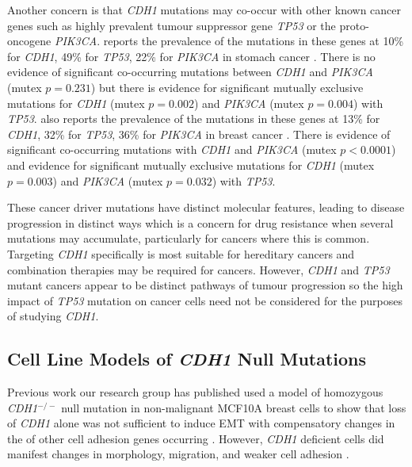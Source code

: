 Another concern is that \textit{CDH1} \glspl{mutation} may co-occur with other known cancer  genes such as highly prevalent \gls{tumour suppressor} gene \textit{\textit{TP53}} or the proto-oncogene \textit{\textit{PIK3CA}}. \citet{cBioPortal} reports the prevalence of the \glspl{mutation} in these genes at 10\% for \textit{CDH1}, 49\% for \textit{\textit{TP53}}, 22\% for \textit{\textit{PIK3CA}} in stomach cancer \citep[393 samples]{TCGA2017prov}. There is no evidence of significant co-occurring \glspl{mutation} between \textit{CDH1} and \textit{\textit{PIK3CA}} (mutex $p=0.231$) but there is evidence for significant mutually exclusive \glspl{mutation} for \textit{CDH1} (mutex $p=0.002$) and \textit{\textit{PIK3CA}} (mutex $p=0.004$) with \textit{\textit{TP53}}. \citet{cBioPortal} also reports the prevalence of the \glspl{mutation} in these genes at 13\% for \textit{CDH1}, 32\% for \textit{\textit{TP53}}, 36\% for \textit{\textit{PIK3CA}} in breast cancer \citep[963 samples]{TCGA2017prov}. There is evidence of significant co-occurring \glspl{mutation} with \textit{CDH1} and \textit{\textit{PIK3CA}} (mutex $p<0.0001$) and evidence for significant mutually exclusive \glspl{mutation} for \textit{CDH1} (mutex $p=0.003$) and \textit{\textit{PIK3CA}} (mutex $p=0.032$) with \textit{\textit{TP53}}.

These cancer \glspl{driver mutation} have distinct molecular features, leading to disease progression in distinct ways which is a concern for drug resistance when several \glspl{mutation} may accumulate, particularly for  cancers where this is common. Targeting \textit{CDH1} specifically is most suitable for \gls{hereditary} cancers and combination therapies may be required for  cancers. However, \textit{CDH1} and \textit{\textit{TP53}} \gls{mutant} cancers appear to be distinct pathways of tumour progression so the high impact of \textit{\textit{TP53}} \gls{mutation} on cancer cells need not be considered for the purposes of studying \textit{CDH1}.
\fi

\subsection{Cell Line Models of \textit{CDH1} Null Mutations}
Previous work our research group has published used a model of  homozygous \textit{CDH1}$^{-/-}$ null \gls{mutation} in non-malignant MCF10A breast cells to show that loss of \textit{CDH1} alone was not sufficient to induce \gls{EMT} with compensatory changes in the  of other cell adhesion genes occurring \citep{Chen2014}. However, \textit{CDH1} deficient cells did manifest changes in morphology, migration, and weaker cell adhesion \citep{Chen2014}.

